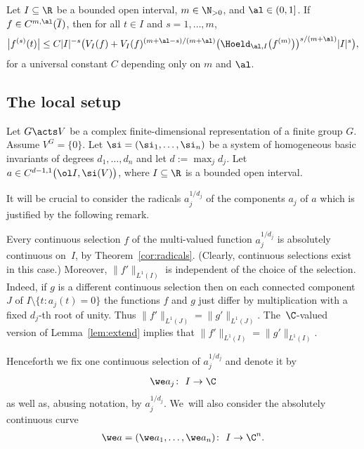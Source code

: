 \begin{Lemma} \label{taylor}
 Let $I \subseteq \R$ be a bounded open interval, $m \in \N_{>0}$, and $\al \in (0,1]$.
 If $f\in C^{m,\al}(\overline I)$, then for all $t\in I$
 and $s = 1,\dots,m$,
 \begin{gather*}
 \big|f^{(s)}(t) \big| \le C |I|^{-s} \bigl(V_I(f) + V_I(f)^{(m+\al-s)/(m+\al)} \big(\Hoeld_{\al,I}\big(f^{(m)}\big)\big)^{s/(m+\al)} |I|^s
 \bigr),
 \end{gather*}
 for a universal constant $C$ depending only on $m$ and $\al$.
\end{Lemma}

\subsection{The local setup}

Let $G \acts V$ be a complex finite-dimensional representation of a finite group $G$.
Assume $V^G = \{0\}$. Let $\si=(\si_1,\dots,\si_n)$ be a system of homogeneous basic invariants
of degrees $d_1,\dots, d_n$ and let $d := \max_j d_j$.
Let $a \in C^{d-1,1}\big(\ol I,\si(V)\big)$, where $I \subseteq \R$ is a bounded open interval.

It will be crucial to consider the radicals $a_j^{1/d_j}$ of the components $a_j$ of $a$ which is justified by the following remark.

\begin{Remark} \label{rem:notation}
Every continuous selection $f$ of
the multi-valued function $a_j^{1/d_j}$ is absolutely continuous on~$I$, by Theorem~\ref{cor:radicals}.
(Clearly, continuous selections exist in this case.)
Moreover, $\|f'\|_{L^1(I)}$ is independent of the
choice of the selection. Indeed, if $g$ is a different continuous selection then on each connected component $J$ of
$I \setminus \{t \colon a_j(t)=0\}$ the functions $f$ and $g$ just differ by multiplication with a fixed $d_j$-th root of unity.
Thus $\|f'\|_{L^1(J)} = \|g'\|_{L^1(J)}$. The~$\C$-valued version of Lemma~\ref{lem:extend} implies that $\|f'\|_{L^1(I)} = \|g'\|_{L^1(I)}$.

Henceforth we fix one continuous selection of $a_j^{1/d_j}$ and
denote it by
\begin{gather*}
 \we a_j \colon\ I \to \C
\end{gather*}
as well as, abusing notation, by $a_j^{1/d_j}$. We~will also consider the absolutely continuous curve
\begin{gather*}
 \we a = (\we a_1,\dots,\we a_n) \colon\ I \to \C^n.
\end{gather*}
\end{Remark}






